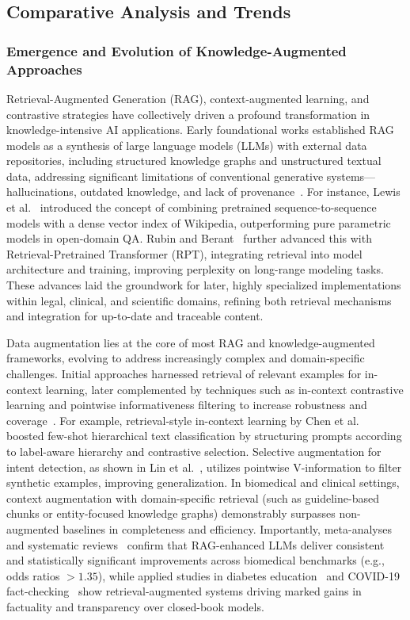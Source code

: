 \documentclass[sigconf]{acmart}
\begin{document}
\subsection{Comparative Analysis and Trends}

\subsubsection{Emergence and Evolution of Knowledge-Augmented Approaches}

Retrieval-Augmented Generation (RAG), context-augmented learning, and contrastive strategies have collectively driven a profound transformation in knowledge-intensive AI applications. Early foundational works established RAG models as a synthesis of large language models (LLMs) with external data repositories, including structured knowledge graphs and unstructured textual data, addressing significant limitations of conventional generative systems—hallucinations, outdated knowledge, and lack of provenance~\cite{ref4,ref10,ref14,ref15,ref28,ref36,ref54,ref61,ref62,ref63,ref64}. For instance, Lewis et al.~\cite{ref10} introduced the concept of combining pretrained sequence-to-sequence models with a dense vector index of Wikipedia, outperforming pure parametric models in open-domain QA. Rubin and Berant~\cite{ref14} further advanced this with Retrieval-Pretrained Transformer (RPT), integrating retrieval into model architecture and training, improving perplexity on long-range modeling tasks. These advances laid the groundwork for later, highly specialized implementations within legal, clinical, and scientific domains, refining both retrieval mechanisms and integration for up-to-date and traceable content.

Data augmentation lies at the core of most RAG and knowledge-augmented frameworks, evolving to address increasingly complex and domain-specific challenges. Initial approaches harnessed retrieval of relevant examples for in-context learning, later complemented by techniques such as in-context contrastive learning and pointwise informativeness filtering to increase robustness and coverage~\cite{ref8,ref10,ref15,ref16,ref19,ref26,ref29,ref35,ref47,ref55,ref63}. For example, retrieval-style in-context learning by Chen et al.~\cite{ref16} boosted few-shot hierarchical text classification by structuring prompts according to label-aware hierarchy and contrastive selection. Selective augmentation for intent detection, as shown in Lin et al.~\cite{ref61}, utilizes pointwise V-information to filter synthetic examples, improving generalization. In biomedical and clinical settings, context augmentation with domain-specific retrieval (such as guideline-based chunks or entity-focused knowledge graphs) demonstrably surpasses non-augmented baselines in completeness and efficiency. Importantly, meta-analyses and systematic reviews~\cite{ref8,ref52} confirm that RAG-enhanced LLMs deliver consistent and statistically significant improvements across biomedical benchmarks (e.g., odds ratios $>1.35$), while applied studies in diabetes education~\cite{ref55} and COVID-19 fact-checking~\cite{ref54} show retrieval-augmented systems driving marked gains in factuality and transparency over closed-book models.
\end{document}
